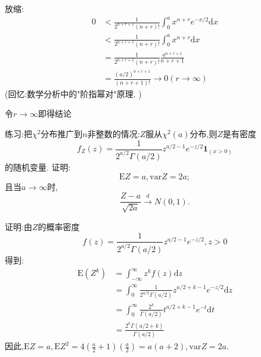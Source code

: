 	\begin{frame}
		放缩:
		\begin{equation}
			\begin{split}
				0&<\frac{1}{2^{n+r+1}(n+r)!}\int_{0}^{a}x^{n+r}e^{-x/2}\mathrm{d}x \\ &<\frac{1}{2^{n+r+1}(n+r)!}\int_{0}^{a}x^{n+r}\mathrm{d}x \\
				&=\frac{1}{2^{n+r+1}(n+r)!}\frac{a^{n+r+1}}{n+r+1} \\
				&=\frac{(a/2)^{n+r+1}}{(n+r+1)!}\rightarrow 0(r\rightarrow\infty)
			\end{split}
		\end{equation}
		(回忆:数学分析中的"阶指幂对"原理.	)
		
		令$r\rightarrow\infty$即得结论
	\end{frame}

	\begin{frame}
		练习:把$\chi^2$分布推广到$n$非整数的情况:$Z$服从$\chi^2(a)$分布,则$Z$是有密度
		\begin{equation}
			f_Z(z)=\frac{1}{2^{a/2}\Gamma(a/2)}z^{a/2-1}e^{-z/2}\bm{1}_{(x>0)}
		\end{equation}
		的随机变量.
		证明: 
		\alert{
		\begin{equation}
			\mathrm{E}Z = a,\mathrm{var}Z=2a;
		\end{equation}
		}
		且当$a\rightarrow\infty$时,
		\begin{equation}
			\frac{Z-a}{\sqrt{2a}}\stackrel{d}{\longrightarrow}N(0,1).
		\end{equation}
	\end{frame}

	\begin{frame}
		证明:由$Z$的概率密度
		\begin{equation}
			f(z) = \frac{1}{2^{a/2}\Gamma(a/2)}z^{a/2-1}e^{-z/2},z>0
		\end{equation}
		得到:
		\begin{equation}
			\begin{split}
				\mathrm{E}(Z^k) &= \int_{-\infty }^{\infty}z^kf(z)\mathrm{d}z \\
				&= \int_{0}^{\infty}\frac{1}{2^{a/2}\Gamma(a/2)}z^{a/2+k-1}e^{-z/2}\mathrm{d}z \\
				&= \int_{0}^{\infty}\frac{2^k}{\Gamma(a/2)}t^{a/2+k-1}e^{-t}\mathrm{d}t \\
				&= \frac{2^k\Gamma(a/2+k)}{\Gamma(a/2)}
			\end{split}
		\end{equation}
		因此,$\mathrm{E}Z = a,\mathrm{E}Z^2 = 4(\frac{a}{2}+1)(\frac{a}{2}) =a(a+2),\mathrm{var}Z=2a. $
	\end{frame}

